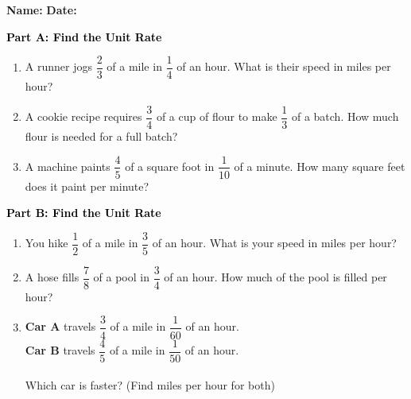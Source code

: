 \documentclass[12pt, letterpaper, fleqn]{article}
\begin{document}
\textbf{Name:} \underline{\hspace{5cm}}
\hfill
\textbf{Date:} \underline{\hspace{3cm}}\\

\begin{tcolorbox}[colback=customteal!20]
\large\textcolor{black}{\textbf{Part A: Find the Unit Rate}}
\end{tcolorbox}

\vspace{3mm}

\begin{enumerate}[itemsep=2.5cm, leftmargin=0.6cm]
\item A runner jogs $\dfrac{2}{3}$ of a mile in $\dfrac{1}{4}$ of an hour. What is their speed in miles per hour?
\item A cookie recipe requires $\dfrac{3}{4}$ of a cup of flour to make $\dfrac{1}{3}$ of a batch. How much flour is needed for a full batch?
\item A machine paints $\dfrac{4}{5}$ of a square foot in $\dfrac{1}{10}$ of a minute. How many square feet does it paint per minute?
\end{enumerate}

\newpage

\begin{tcolorbox}[colback=customteal!20]
\large\textcolor{black}{\textbf{Part B: Find the Unit Rate}}
\end{tcolorbox}

\vspace{3mm}

\begin{enumerate}[itemsep=2.5cm, leftmargin=0.6cm, resume]
\item You hike $\dfrac{1}{2}$ of a mile in $\dfrac{3}{5}$ of an hour. What is your speed in miles per hour?
\item A hose fills $\dfrac{7}{8}$ of a pool in $\dfrac{3}{4}$ of an hour. How much of the pool is filled per hour?
\item \textbf{Car A} travels $\dfrac{3}{4}$ of a mile in $\dfrac{1}{60}$ of an hour. \\
\textbf{Car B} travels $\dfrac{4}{5}$ of a mile in $\dfrac{1}{50}$ of an hour. \\ \\
Which car is faster? (Find miles per hour for both)
\end{enumerate}
\end{document}
